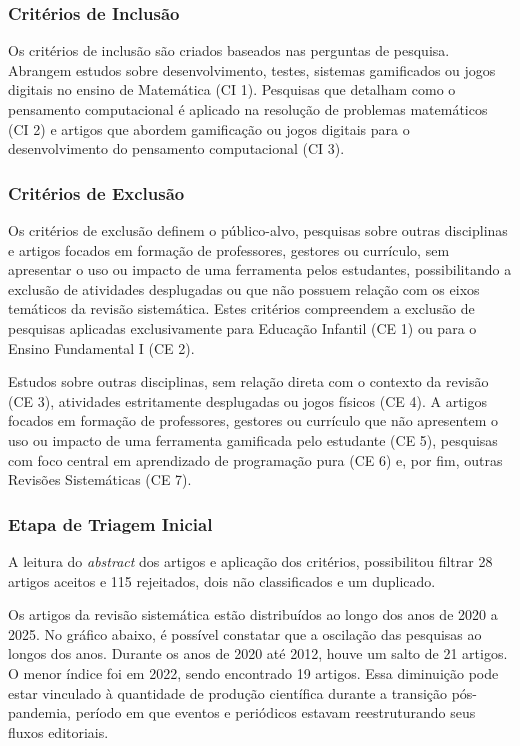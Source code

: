 \documentclass[12pt]{article}
\begin{document}
\subsubsection{Critérios de Inclusão}
Os critérios de inclusão são criados baseados nas perguntas de pesquisa. Abrangem estudos sobre desenvolvimento, testes, sistemas gamificados ou jogos digitais no ensino de Matemática (CI 1). Pesquisas que detalham como o pensamento computacional é aplicado na resolução de problemas matemáticos (CI 2) e artigos que abordem gamificação ou jogos digitais para o desenvolvimento do pensamento computacional (CI 3).

\subsubsection{Critérios de Exclusão}
Os critérios de exclusão definem o público-alvo, pesquisas sobre outras disciplinas e artigos focados em formação de professores, gestores ou currículo, sem apresentar o uso ou impacto de uma ferramenta pelos estudantes, possibilitando a exclusão de atividades desplugadas ou que não possuem relação com os eixos temáticos da revisão sistemática. Estes critérios compreendem a exclusão de pesquisas aplicadas exclusivamente para Educação Infantil (CE 1) ou para o Ensino Fundamental I (CE 2). 

Estudos sobre outras disciplinas, sem relação direta com o contexto da revisão (CE 3), atividades estritamente desplugadas ou jogos físicos (CE 4). A artigos focados em formação de professores, gestores ou currículo que não apresentem o uso ou impacto de uma ferramenta gamificada pelo estudante (CE 5), pesquisas com foco central em aprendizado de programação pura (CE 6) e, por fim, outras Revisões Sistemáticas (CE 7).

\subsubsection{Etapa de Triagem Inicial}

A leitura do \textit{abstract} dos artigos e aplicação dos critérios, possibilitou filtrar 28 artigos aceitos e 115 rejeitados, dois não classificados e um duplicado. 

Os artigos da revisão sistemática estão distribuídos ao longo dos anos de 2020 a 2025. No gráfico abaixo, é possível constatar que a oscilação das pesquisas ao longos dos anos. Durante os anos de 2020 até 2012, houve um salto de 21 artigos. O menor índice foi em 2022, sendo encontrado 19 artigos. Essa diminuição pode estar vinculado à quantidade de produção científica durante a transição pós-pandemia, período em que eventos e periódicos estavam reestruturando seus fluxos editoriais.
\end{document}
